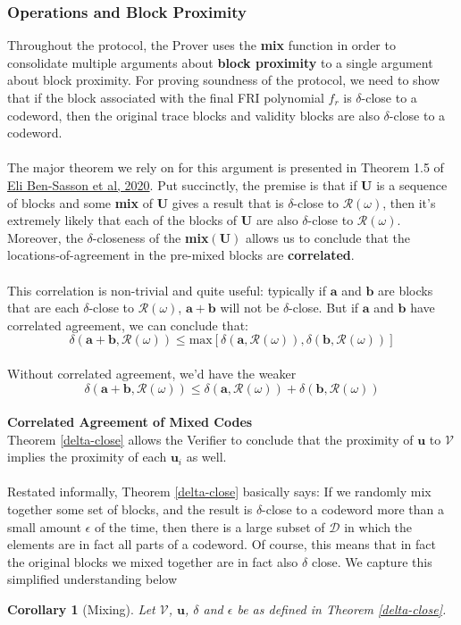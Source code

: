 \documentclass[10pt,letterpaper,titlepage]{article}
\newcommand{\w}[0]{\omega}
\newcommand{\dd}[0]{\delta}
\newcommand{\e}[0]{\epsilon}
\newcommand{\D}[0]{\mathcal{D}}
\newtheorem{corollary}{Corollary}
\theoremstyle{definition}
\begin{document}
\begin{appendices}
\subsubsection{Operations and Block Proximity}
Throughout the protocol, the Prover uses the \textbf{mix} function in order to consolidate multiple arguments about \textbf{block proximity} to a single argument about block proximity. 
For proving soundness of the protocol, we need to show that if the block associated with the final FRI polynomial $f_r$ is $\delta$-close to a codeword, then the original trace blocks and validity blocks are also $\delta$-close to a codeword.  \\
\\
The major theorem we rely on for this argument is presented in Theorem 1.5 of \href{https://eprint.iacr.org/2020/654.pdf}{Eli Ben-Sasson et al, 2020}. 
Put succinctly, the premise is that if $\mathbf{U}$ is a sequence of blocks and some \textbf{mix} of $\mathbf{U}$ gives a result that is $\delta$-close to $\mathcal{R}(\w)$, then it's extremely likely that each of the blocks of $\mathbf{U}$ are also $\delta$-close to $\mathcal{R}(\w)$. 
Moreover, the $\delta$-closeness of the \textbf{mix}$(\mathbf{U})$ allows us to conclude that the locations-of-agreement in the pre-mixed blocks are \textbf{correlated}. \\
\\
This correlation is non-trivial and quite useful: typically if $\mathbf{a}$ and $\mathbf{b}$ are blocks that are each $\delta$-close to $\mathcal{R}(\w)$, $\mathbf{a+b}$ will not be $\delta$-close. 
But if $\mathbf{a}$ and $\mathbf{b}$ have correlated agreement, we can conclude that:
\[\delta(\mathbf{a}+\mathbf{b},\mathcal{R}(\w)) \leq \text{max}[\delta(\mathbf{a},\mathcal{R}(\w)),\delta(\mathbf{b},\mathcal{R}(\w))]\]
\\
Without correlated agreement, we'd have the weaker \[\delta(\mathbf{a}+\mathbf{b},\mathcal{R}(\w)) \leq \delta(\mathbf{a},\mathcal{R}(\w)) + \delta(\mathbf{b},\mathcal{R}(\w)) \]
\\
\textbf{Correlated Agreement of Mixed Codes}
\\
 Theorem \ref{delta-close} allows the Verifier to conclude that the proximity of $\mathbf{u}$ to $\mathcal{V}$ implies the proximity of each $\mathbf{u}_i$ as well. \\
\\
Restated informally, Theorem \ref*{delta-close} basically says:
If we randomly mix together some set of blocks, and the result is $\delta$-close to a codeword more than a small amount $\epsilon$ of the time, then there is a large subset of $\D$ in which the elements are in fact all parts of a codeword.
Of course, this means that in fact the original blocks we mixed together are in fact also $\dd$ close.
We capture this simplified understanding below
\begin{corollary}[Mixing]
  Let $\mathcal{V}$, $\mathbf{u}$, $\dd$ and $\e$ be as defined in Theorem \ref*{delta-close}.


\end{corollary}
\end{appendices}
\end{document}
